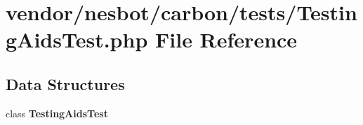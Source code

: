 \section{vendor/nesbot/carbon/tests/\+Testing\+Aids\+Test.php File Reference}
\label{_testing_aids_test_8php}
\subsection*{Data Structures}
\begin{DoxyCompactItemize}
\item 
class {\bf Testing\+Aids\+Test}
\end{DoxyCompactItemize}
